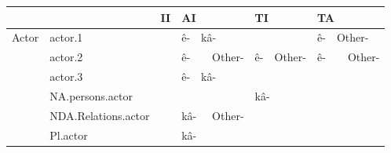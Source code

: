 \begin{table}[h!]
\footnotesize
\begin{tabular}{@{}llllllllllll@{}}
\toprule
               &                     & II                             & \multicolumn{3}{l}{AI}                                                                        & \multicolumn{3}{l}{TI}                                                                             & \multicolumn{3}{l}{TA}                                                                         \\ \midrule
Actor          & actor.1             &                                & \cellcolor[HTML]{B6D7A8}ê-       & \multicolumn{2}{l}{\cellcolor[HTML]{EA9999}kâ-}      &                               &                                &                                   & \cellcolor[HTML]{B6D7A8}ê-      & \multicolumn{2}{l}{\cellcolor[HTML]{EA9999}Other-}     \\
               & actor.2             &                                & \multicolumn{2}{l}{\cellcolor[HTML]{EA9999}ê-}  & \cellcolor[HTML]{B6D7A8}Other-        & \cellcolor[HTML]{EA9999}ê- & \multicolumn{2}{l}{\cellcolor[HTML]{B6D7A8}Other-}              & \multicolumn{2}{l}{\cellcolor[HTML]{EA9999}ê-}  & \cellcolor[HTML]{B6D7A8}Other-         \\
               & actor.3             &                                & \cellcolor[HTML]{B6D7A8}ê-       & \multicolumn{2}{l}{\cellcolor[HTML]{EA9999}kâ-}      &                               &                                &                                   &                                    &               &                                           \\
               & NA.persons.actor    &                                &                                     &              &                                          & \multicolumn{3}{l}{\cellcolor[HTML]{EA9999}kâ-}                                                 &                                    &               &                                           \\
               & NDA.Relations.actor &                                & \multicolumn{2}{l}{\cellcolor[HTML]{B6D7A8}kâ-} & \cellcolor[HTML]{EA9999}Other-        &                               &                                &                                   &                                    &               &                                           \\
               & Pl.actor            &                                & \multicolumn{3}{l}{\cellcolor[HTML]{B6D7A8}kâ-}                                            &                               &                                &                                   &                                    &               &                                           \\

\end{tabular}
\end{table}
